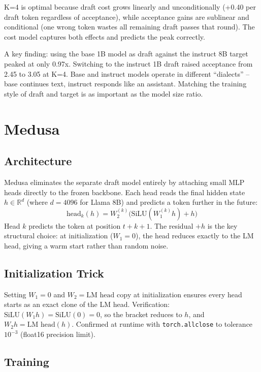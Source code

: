 \documentclass[12pt, a4paper]{article}
\begin{document}
K=4 is optimal because draft cost grows linearly and unconditionally (+0.40 per
draft token regardless of acceptance), while acceptance gains are sublinear and
conditional (one wrong token wastes all remaining draft passes that round). The
cost model captures both effects and predicts the peak correctly.

A key finding: using the base 1B model as draft against the instruct 8B target
peaked at only 0.97x. Switching to the instruct 1B draft raised acceptance from
2.45 to 3.05 at K=4. Base and instruct models operate in different ``dialects'' --
base continues text, instruct responds like an assistant. Matching the training
style of draft and target is as important as the model size ratio.

\section{Medusa}

\subsection{Architecture}

Medusa \cite{cai2024} eliminates the separate draft model entirely by attaching
small MLP heads directly to the frozen backbone. Each head reads the final hidden
state $h \in \mathbb{R}^{d}$ (where $d = 4096$ for Llama 8B) and predicts a token
further in the future:
\[
    \text{head}_k(h) = W_2^{(k)}\bigl(\text{SiLU}(W_1^{(k)} h) + h\bigr)
\]
Head $k$ predicts the token at position $t + k + 1$. The residual $+h$ is the key
structural choice: at initialization ($W_1 = 0$), the head reduces exactly to the
LM head, giving a warm start rather than random noise.

\subsection{Initialization Trick}

Setting $W_1 = 0$ and $W_2 = \text{LM head copy}$ at initialization ensures every
head starts as an exact clone of the LM head. Verification: $\text{SiLU}(W_1 h) =
\text{SiLU}(0) = 0$, so the bracket reduces to $h$, and $W_2 h = \text{LM head}(h)$.
Confirmed at runtime with \texttt{torch.allclose} to tolerance $10^{-3}$ (float16
precision limit).

\subsection{Training}
\end{document}
